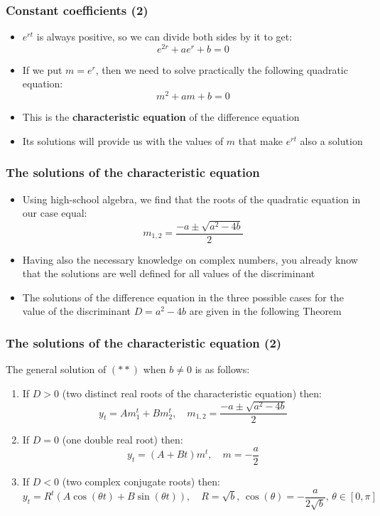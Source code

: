 \documentclass[10pt,usenames,dvipsnames]{beamer}
\theoremstyle{definition}
\begin{document}
\begin{frame}[fragile]
\frametitle{Constant coefficients (2)}
\begin{itemize}
	\item $e^{rt}$ is always positive, so we can divide both sides by it to get:
	\[
		e^{2r} + ae^{r} + b = 0
	\]
	\item If we put $m = e^{r}$, then we need to solve practically the following quadratic equation:
	\[
		m^{2} + am + b = 0
	\]
	\item This is the \textbf{characteristic equation} of the difference equation
	\item Its solutions will provide us with the values of $m$ that make $e^{rt}$ also a solution
\end{itemize}
\end{frame}

\begin{frame}[fragile]
\frametitle{The solutions of the characteristic equation}
\begin{itemize}
	\item Using high-school algebra, we find that the roots of the quadratic equation in our case equal:
	\[
		m_{1,2} = \frac{- a \pm \sqrt{a^{2} - 4b}}{2}
	\]
	\item Having also the necessary knowledge on complex numbers, you already know that the solutions are well defined for all values of the discriminant
	\item The solutions of the difference equation in the three possible cases for the value of the discriminant $D = a^{2} - 4b$ are given in the following Theorem
\end{itemize}
\end{frame}

\begin{frame}[fragile]
\frametitle{The solutions of the characteristic equation (2)}
\begin{theorem}
	The general solution of $(**)$ when $b \neq 0$ is as follows:
	\begin{enumerate}
	 	\item If $D > 0$ (two distinct real roots of the characteristic equation) then:
	 	\[
	 		y_{t} = A m_{1}^{t} + B m_{2}^{t}, \quad m_{1,2} = \frac{- a \pm \sqrt{a^{2} - 4b}}{2}
	 	\]
	 	\item If $D = 0$ (one double real root) then:
	 	\[
	 		y_{t} = (A + Bt) m^{t}, \quad m = -\frac{a}{2}
	 	\]
	 	\item If $D < 0$ (two complex conjugate roots) then:
	 	\[
	 		y_{t} = R^{t}(A\cos(\theta t) + B\sin(\theta t)), \quad R = \sqrt{b},\, \cos(\theta) = -\frac{a}{2\sqrt{b}},\, \theta \in [0,\pi]
	 	\]
	\end{enumerate} 
\end{theorem}
\end{frame}
\end{document}
